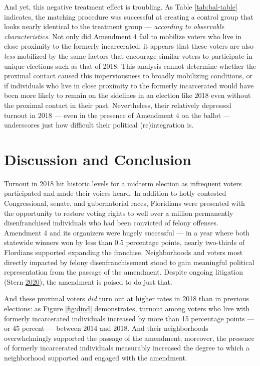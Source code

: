 \documentclass[
  12pt,
]{article}
\begin{document}
And yet, this negative treatment effect is troubling. As Table \ref{tab:bal-table} indicates, the matching procedure was successful at creating a control group that looks nearly identical to the treatment group --- \emph{according to observable characteristics}. Not only did Amendment 4 fail to mobilize voters who live in close proximity to the formerly incarcerated; it appears that these voters are also \emph{less} mobilized by the same factors that encourage similar voters to participate in unique elections such as that of 2018. This analysis cannot determine whether the proximal contact caused this imperviousness to broadly mobilizing conditions, or if individuals who live in close proximity to the formerly incarcerated would have been more likely to remain on the sidelines in an election like 2018 even without the proximal contact in their past. Nevertheless, their relatively depressed turnout in 2018 --- even in the presence of Amendment 4 on the ballot --- underscores just how difficult their political (re)integration is.

\hypertarget{discussion-and-conclusion}{%
\section*{Discussion and Conclusion}\label{discussion-and-conclusion}}

Turnout in 2018 hit historic levels for a midterm election as infrequent voters participated and made their voices heard. In addition to hotly contested Congressional, senate, and gubernatorial races, Floridians were presented with the opportunity to restore voting rights to well over a million permanently disenfranchised individuals who had been convicted of felony offenses. Amendment 4 and its organizers were hugely successful --- in a year where both statewide winners won by less than 0.5 percentage points, nearly two-thirds of Flordians supported expanding the franchise. Neighborhoods and voters most directly impacted by felony disenfranchisement stood to gain meaningful political representation from the passage of the amendment. Despite ongoing litigation (Stern \protect\hyperlink{ref-Stern2020}{2020}), the amendment is poised to do just that.

And these proximal voters \emph{did} turn out at higher rates in 2018 than in previous elections: as Figure \ref{fig:dind} demonstrates, turnout among voters who live with formerly incarcerated individuals increased by more than 15 percentage points --- or 45 percent --- between 2014 and 2018. And their neighborhoods overwhelmingly supported the passage of the amendment; moreover, the presence of formerly incarcerated individuals measurably increased the degree to which a neighborhood supported and engaged with the amendment.
\end{document}
